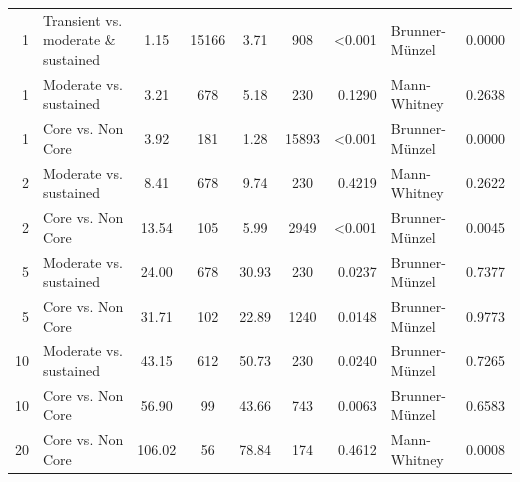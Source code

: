 \begin{table}[H]
\begin{tabular}{r p{4cm} c c c c r l r}
1 & Transient vs. moderate \& sustained &  1.15 & 15166 & 3.71 & 908 & \textless 0.001 &  Brunner-Münzel & 0.0000 \\ 
1 & Moderate vs. sustained &  3.21 & 678 & 5.18 & 230 & 0.1290 &  Mann-Whitney & 0.2638 \\ 
1 & Core vs. Non Core &  3.92 & 181 & 1.28 & 15893 & \textless 0.001 &  Brunner-Münzel & 0.0000 \\ 
2 & Moderate vs. sustained &  8.41 & 678 & 9.74 & 230 & 0.4219 &  Mann-Whitney & 0.2622 \\ 
2 & Core vs. Non Core &  13.54 & 105 & 5.99 & 2949 & \textless 0.001 &  Brunner-Münzel & 0.0045 \\ 
5 & Moderate vs. sustained &  24.00 & 678 & 30.93 & 230 & 0.0237 &  Brunner-Münzel & 0.7377 \\ 
5 & Core vs. Non Core &  31.71 & 102 & 22.89 & 1240 & 0.0148 &  Brunner-Münzel & 0.9773 \\ 
10 & Moderate vs. sustained &  43.15 & 612 & 50.73 & 230 & 0.0240 &  Brunner-Münzel & 0.7265 \\ 
10 & Core vs. Non Core &  56.90 & 99 & 43.66 & 743 & 0.0063 &  Brunner-Münzel & 0.6583 \\ 
20 & Core vs. Non Core &  106.02 & 56 & 78.84 & 174 & 0.4612 &  Mann-Whitney & 0.0008 \\ 
\bottomrule
\end{tabular}%
\label{tab:codebase_graph_latex_repository_graph_component_time_series_statistical_significance_test_normal_classes} 
\end{table}
\newpage 
